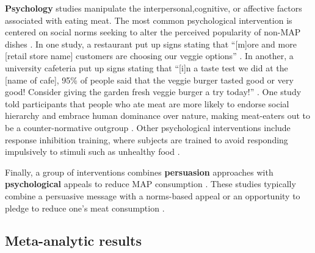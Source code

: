 \documentclass[sn-nature,referee,pdflatex]{sn-jnl}
\begin{document}
\textbf{Psychology} studies
\citep{aldoh2023, allen2002, camp2019, coker2022, piester2020, sparkman2020}
manipulate the interpersonal,cognitive, or affective factors associated
with eating meat. The most common psychological intervention is centered
on social norms seeking to alter the perceived popularity of non-MAP
dishes \citep{sparkman2020}. In one study, a restaurant put up signs
stating that ``{[}m{]}ore and more {[}retail store name{]} customers are
choosing our veggie options'' \citep{coker2022}. In another, a
university cafeteria put up signs stating that ``{[}i{]}n a taste test
we did at the {[}name of cafe{]}, 95\% of people said that the veggie
burger tasted good or very good! Consider giving the garden fresh veggie
burger a try today!'' \citep{piester2020}. One study told participants
that people who ate meat are more likely to endorse social hierarchy and
embrace human dominance over nature, making meat-eaters out to be a
counter-normative outgroup \citep{allen2002}. Other psychological
interventions include response inhibition training, where subjects are
trained to avoid responding impulsively to stimuli such as unhealthy
food \citep{camp2019}.

\begin{comment}
Norms might be descriptive, stating how many people engaged in the desired behavior [@aldoh2023], or dynamic, telling subjects that the number of people reducing their MAP consumption is increasing over time [@aldoh2023; @coker2022; @sparkman2020].
Another study looked at response inhibition training, where subjects are trained to associate meat with an inhibiting response [@camp2019].
The first psychology study meeting our inclusion criteria was published in 2017.
\end{comment}

Finally, a group of interventions combines \textbf{persuasion}
approaches with \textbf{psychological} appeals to reduce MAP consumption
\citep{berndsen2005, bertolaso2015, carfora2023, fehrenbach2015, hennessy2016, mathur2021effectiveness, mattson2020, piester2020, shreedhar2021}.
These studies typically combine a persuasive message with a norms-based
appeal \citep{piester2020, mattson2020} or an opportunity to pledge to
reduce one's meat consumption
\citep{mathur2021effectiveness, shreedhar2021}.

\subsection{Meta-analytic results}\label{sec2.3}
\end{document}
